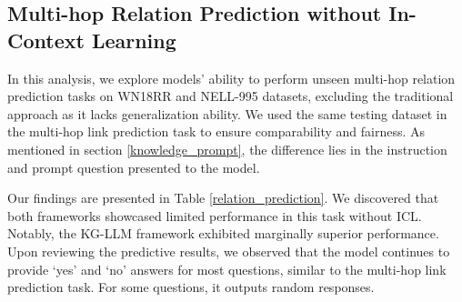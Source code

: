 \documentclass[pmlr]{jmlr}%
\begin{document}



\subsection{Multi-hop Relation Prediction without In-Context Learning}

In this analysis, we explore models' ability to perform unseen multi-hop relation prediction tasks on WN18RR and NELL-995 datasets, excluding the traditional approach as it lacks generalization ability. We used the same testing dataset in the multi-hop link prediction task to ensure comparability and fairness. As mentioned in section \ref{knowledge_prompt}, the difference lies in the instruction and prompt question presented to the model. 

Our findings are presented in Table \ref{relation_prediction}. We discovered that both frameworks showcased limited performance in this task without ICL. Notably, the KG-LLM framework exhibited marginally superior performance. Upon reviewing the predictive results, we observed that the model continues to provide `yes' and `no' answers for most questions, similar to the multi-hop link prediction task. For some questions, it outputs random responses.
\end{document}
